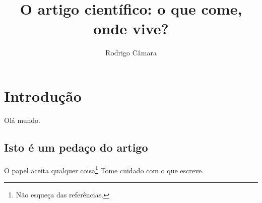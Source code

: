 \documentclass[10pt,a4paper]{article}
\author{Rodrigo Câmara}
\title{O artigo científico: o que come, onde vive?}
\begin{document}
\maketitle
\section{Introdução}
Olá mundo.
\subsection{Isto é um pedaço do artigo}
O papel aceita qualquer coisa\footnote{Não esqueça das referências.} Tome cuidado com o que escreve.
\end{document}
